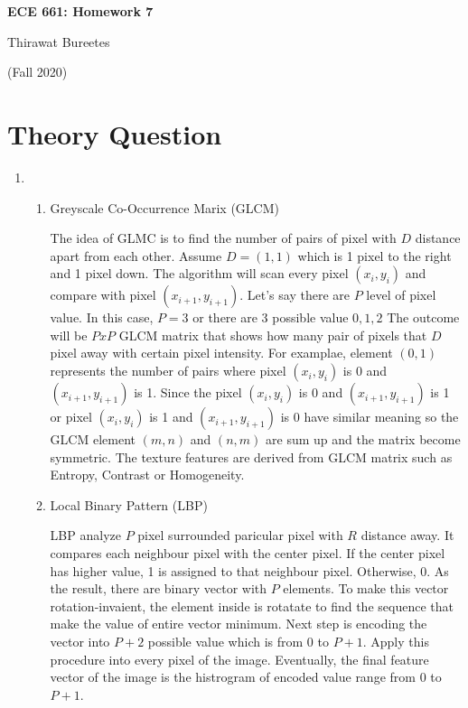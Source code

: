 \documentclass[11pt]{article}
\begin{document}
\begin{center}
\Large{\textbf{ECE 661: Homework 7}}

Thirawat Bureetes

(Fall 2020)
\end{center}
	
 

\section*{Theory Question}

\begin{enumerate}

\item 

\begin{enumerate}
\item Greyscale Co-Occurrence Marix (GLCM)

The idea of GLMC is to find the number of pairs of pixel with $D$ distance apart from each other. Assume $D = (1, 1)$ which is 1 pixel to the right and 1 pixel down. The algorithm will scan every pixel $(x_i, y_i)$ and compare with pixel $(x_{i+1}, y_{i+1})$. Let's say there are $P$ level of pixel value. In this case, $P =3$ or there are 3 possible value ${0, 1, 2}$ The outcome will be $P x P$ GLCM matrix that shows how many pair of pixels that $D$ pixel away with certain pixel intensity. For examplae, element $(0, 1)$ represents the number of pairs where pixel $(x_i, y_i)$ is 0 and $(x_{i+1}, y_{i+1})$ is 1. Since the  pixel $(x_i, y_i)$ is 0 and $(x_{i+1}, y_{i+1})$ is 1 or  pixel $(x_i, y_i)$ is 1 and $(x_{i+1}, y_{i+1})$ is 0 have similar meaning so the GLCM element $(m, n)$ and $(n,m)$ are sum up and the matrix become symmetric. The texture features are derived from GLCM matrix such as Entropy, Contrast or Homogeneity.

\item Local Binary Pattern (LBP)

LBP analyze $P$ pixel surrounded paricular pixel with $R$ distance away. It compares each neighbour pixel with the center pixel. If the center pixel has higher value, 1 is assigned to that neighbour pixel. Otherwise, 0. As the result, there are binary vector with $P$ elements. To make this vector rotation-invaient, the element inside is rotatate to find the sequence that make the value of entire vector minimum. Next step is encoding the vector into $P+2$ possible value which is from $0$ to $P+1$. Apply this procedure into every pixel of the image. Eventually, the final feature vector of the image is the histrogram of encoded value range from 0 to $P+1$. 


\end{enumerate}
\end{enumerate}
\end{document}
